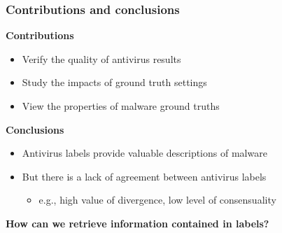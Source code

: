 \begin{frame}


\end{frame}

\begin{frame}
    \frametitle{Contributions and conclusions}
    \centering

    \begin{block}{}
        \centering
        \textbf{Contributions}
    \end{block}
    \begin{itemize}
        \item Verify the quality of antivirus results
        \item Study the impacts of ground truth settings
        \item View the properties of malware ground truths
    \end{itemize}

    \medskip{}

    \begin{block}{}
        \centering
        \textbf{Conclusions}
    \end{block}
    \begin{itemize}
        \item Antivirus labels provide valuable descriptions of malware
        \item But there is a lack of agreement between antivirus labels
        \begin{itemize}
            \item e.g., high value of divergence, low level of consensuality
        \end{itemize}
    \end{itemize}

    \medskip{}

    \textbf{How can we retrieve information contained in labels?}

\end{frame}

